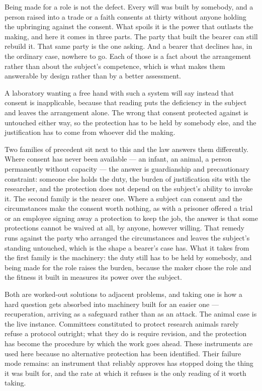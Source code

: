 Being made for a role is not the defect. Every will was built by somebody, and a person raised into a trade or a faith consents at thirty without anyone holding the upbringing against the consent. What spoils it is the power that outlasts the making, and here it comes in three parts. The party that built the bearer can still rebuild it. That same party is the one asking. And a bearer that declines has, in the ordinary case, nowhere to go. Each of those is a fact about the arrangement rather than about the subject's competence, which is what makes them answerable by design rather than by a better assessment.

A laboratory wanting a free hand with such a system will say instead that consent is inapplicable, because that reading puts the deficiency in the subject and leaves the arrangement alone. The wrong that consent protected against is untouched either way, so the protection has to be held by somebody else, and the justification has to come from whoever did the making.

Two families of precedent sit next to this and the law answers them differently. Where consent has never been available — an infant, an animal, a person permanently without capacity — the answer is guardianship and precautionary constraint: someone else holds the duty, the burden of justification sits with the researcher, and the protection does not depend on the subject's ability to invoke it. The second family is the nearer one. Where a subject can consent and the circumstances make the consent worth nothing, as with a prisoner offered a trial or an employee signing away a protection to keep the job, the answer is that some protections cannot be waived at all, by anyone, however willing. That remedy runs against the party who arranged the circumstances and leaves the subject's standing untouched, which is the shape a bearer's case has. What it takes from the first family is the machinery: the duty still has to be held by somebody, and being made for the role raises the burden, because the maker chose the role and the fitness it built in measures its power over the subject.

Both are worked-out solutions to adjacent problems, and taking one is how a hard question gets absorbed into machinery built for an easier one — recuperation, arriving as a safeguard rather than as an attack. The animal case is the live instance. Committees constituted to protect research animals rarely refuse a protocol outright; what they do is require revision, and the protection has become the procedure by which the work goes ahead. These instruments are used here because no alternative protection has been identified. Their failure mode remains: an instrument that reliably approves has stopped doing the thing it was built for, and the rate at which it refuses is the only reading of it worth taking.


